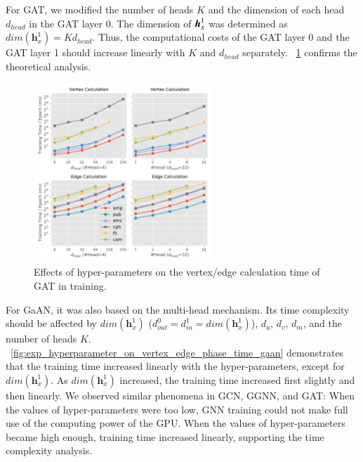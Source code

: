 For GAT, we modified the number of heads $K$ and the dimension of each head $d_{head}$ in the GAT layer 0.
%
The dimension of $\boldsymbol{h}^1_x$ was determined as $dim(\boldsymbol{h}^1_x) = K d_{head}$.
%
Thus, the computational costs of the GAT layer 0 and the GAT layer 1 should increase linearly with $K$ and $d_{head}$ separately. 
%
\figurename~\ref{fig:exp_hyperparameter_on_vertex_edge_phase_time_gat} confirms the theoretical analysis.


\begin{figure}[H]
    \centering
    \includegraphics[width=0.6\textwidth]{figs/experiments/exp_hyperparameter_on_vertex_edge_phase_time_gat.pdf}
    \caption{Effects of hyper-parameters on the vertex/edge calculation time of GAT in training.}
    \label{fig:exp_hyperparameter_on_vertex_edge_phase_time_gat}
\end{figure}

For GaAN, it was also based on the multi-head mechanism.
%
Its time complexity should be affected by $dim(\boldsymbol{h}^1_x)$ ($d^0_{out} = d^1_{in} = dim(\boldsymbol{h}^1_x)$), $d_a$, $d_v$, $d_m$, and the number of heads $K$.
%
\figurename~\ref{fig:exp_hyperparameter_on_vertex_edge_phase_time_gaan} demonstrates that the training time increased linearly with the hyper-parameters, except for $dim(\boldsymbol{h}^1_x)$.
As $dim(\boldsymbol{h}^1_x)$ increased, the training time increased first slightly and then linearly.
We observed similar phenomena in GCN, GGNN, and GAT:
When the values of hyper-parameters were too low, GNN training could not make full use of the computing power of the GPU.
%
When the values of hyper-parameters became high enough, training time increased linearly, supporting the time complexity analysis.


